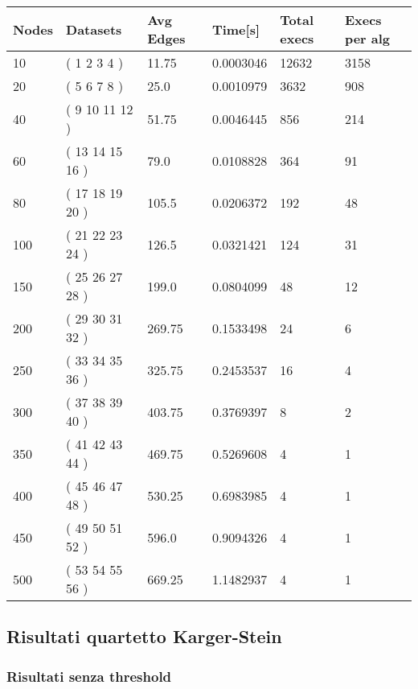 \begin{longtable}[c]{llllll}
  \textbf{Nodes} & \textbf{Datasets} & \textbf{Avg Edges} & \textbf{Time{[}s{]}} & \textbf{Total execs} & \textbf{Execs per alg} \\
  \endhead
  10 & ( 1 2 3 4 ) & 11.75 & 0.0003046 & 12632 & 3158 \\
  20 & ( 5 6 7 8 ) & 25.0 & 0.0010979 & 3632 & 908 \\
  40 & ( 9 10 11 12 ) & 51.75 & 0.0046445 & 856 & 214 \\
  60 & ( 13 14 15 16 ) & 79.0 & 0.0108828 & 364 & 91 \\
  80 & ( 17 18 19 20 ) & 105.5 & 0.0206372 & 192 & 48 \\
  100 & ( 21 22 23 24 ) & 126.5 & 0.0321421 & 124 & 31 \\
  150 & ( 25 26 27 28 ) & 199.0 & 0.0804099 & 48 & 12 \\
  200 & ( 29 30 31 32 ) & 269.75 & 0.1533498 & 24 & 6 \\
  250 & ( 33 34 35 36 ) & 325.75 & 0.2453537 & 16 & 4 \\
  300 & ( 37 38 39 40 ) & 403.75 & 0.3769397 & 8 & 2 \\
  350 & ( 41 42 43 44 ) & 469.75 & 0.5269608 & 4 & 1 \\
  400 & ( 45 46 47 48 ) & 530.25 & 0.6983985 & 4 & 1 \\
  450 & ( 49 50 51 52 ) & 596.0 & 0.9094326 & 4 & 1 \\
  500 & ( 53 54 55 56 ) & 669.25 & 1.1482937 & 4 & 1
  \end{longtable}

\subsection{Risultati quartetto Karger-Stein}

\subsubsection{Risultati senza threshold}

